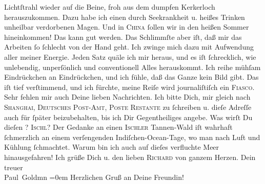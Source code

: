 \begin{ledgroupsized}[t]{13cm}
               Lichtſtrahl wieder auf die Beine, froh aus {\pb}dem
               dumpfen Kerkerloch herauszukommen. Dazu habe ich einen \strikeout{\textcolor{gray}{du}} durch Seekrankheit u. heißes Trinken unheilbar verdorbenen Magen. Und in \textsc{China} ſollen wir in den heißen Sommer hineinkommen! Das kann gut werden. Das
               Schlimmſte aber iſt, daß mir das Arbeiten ſo ſchlecht von der Hand geht. Ich zwinge
               mich dazu mit Aufwendung aller meiner Energie. {\pb}Jeden Satz quäle ich mir heraus, und es iſt ſchrecklich, wie unlebendig,
               unperſönlich und conventionell Alles herauskommt. Ich reihe mühſam Eindrückchen an
               Eindrückchen, und ich fühle, daß das Ganze kein Bild gibt. Das iſt tief verſtimmend,
               und ich fürchte, meine Reiſe wird journaliſtiſch ein \textsc{Fiasco}.\pend
           \pstart
           Sehr fehlen mir auch Deine lieben Nachrichten. Ich bitte Dich, mir gleich {\pb}nach \textsc{Shanghai}, \textsc{Deutsches Post-Amt, Poste Restante} zu
               ſchreiben u. dieſe Adreſſe auch für ſpäter beizubehalten, bis ich Dir Gegentheiliges
               angebe.\pend
           \pstart
           Was wirſt Du dieſen \label{K_L02846-1v}\label{K_L02846-1h}? \textsc{Ischl}? Der Gedanke an einen \textsc{Ischler} Tannen-Wald  iſt {\pb}wahrhaft ſchmerzlich an einem verſengenden
                  Indiſchen-Ocean-Tage, wo man nach Luft und
               Kühlung ſchmachtet. Warum bin ich auch auf dieſes verfluchte Meer hinausgefahren!\pend
           \pstart
           Ich grüße Dich u. den lieben \textsc{Richard} von ganzem Herzen.\pend
           \pstart
           Dein treuer {\\[\baselineskip]}\spacefill\mbox{Paul Goldmn}\pend
           \leftskip=0em{}\pstart
           \noindent{}Herzlichen Gruß an Deine Freundin!\pend
           
         
         \endnumbering{}\end{ledgroupsized}  \newcommand{\dateiname}{L02846}\newcommand{\titel}{Paul Goldmann an Arthur Schnitzler, 21. 4. [1898]}\newcommand{\editorInnen}{Martin Anton Müller und Laura Untner}
      